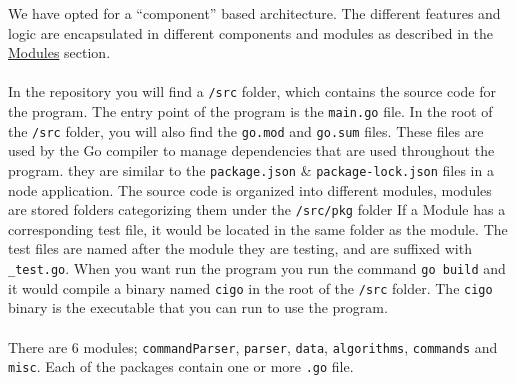 \documentclass[11pt]{article}
\begin{document}
We have opted for a ``component'' based architecture. The different features and
logic are encapsulated in different components and modules as described in the
\hyperref[sec:modules]{Modules} section.
\\\\
In the repository you will find a \texttt{/src} folder, which contains the source code for
the program. The entry point of the program is the \texttt{main.go} file. In the root of
the \texttt{/src} folder, you will also find the \texttt{go.mod} and \texttt{go.sum} files.
These files are used by the Go compiler to manage dependencies that are used throughout the program.
they are similar to the \texttt{package.json} \& \texttt{package-lock.json} files in a node application.
The source code is organized into different modules, modules are stored folders categorizing them under the \texttt{/src/pkg} folder
If a Module has a corresponding test file, it would be located in the same folder as the module. The test files are named after the
module they are testing, and are suffixed with \texttt{\_test.go}. When you want run the program you run the command
\texttt{go build} and it would compile a binary named \texttt{cigo} in the root of the \texttt{/src} folder. The
\texttt{cigo} binary is the executable that you can run to use the program.
\\\\
There are 6 modules; \texttt{commandParser}, \texttt{parser}, \texttt{data}, \texttt{algorithms}, \texttt{commands} and \texttt{misc}.
Each of the packages contain one or more \texttt{.go} file.
\end{document}
